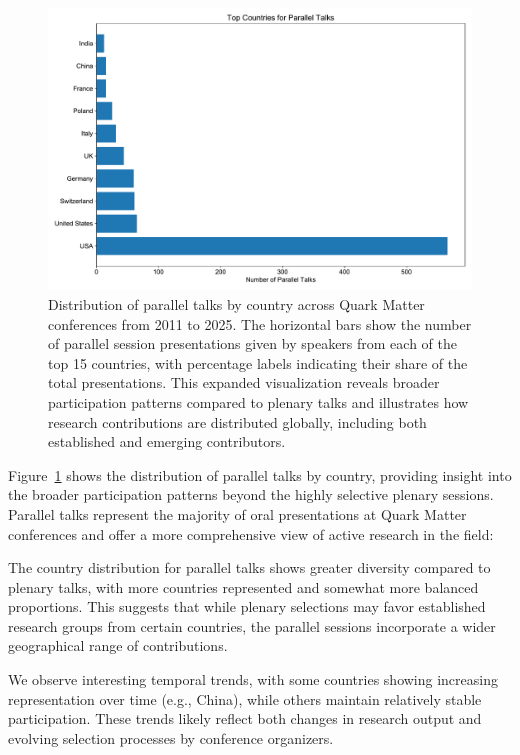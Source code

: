\documentclass[a4paper,11pt]{article}
\begin{document}
\begin{figure}[H]
\centering
\includegraphics[width=\textwidth]{figures/parallel_talks_by_country.pdf}
\caption{Distribution of parallel talks by country across Quark Matter conferences from 2011 to 2025. The horizontal bars show the number of parallel session presentations given by speakers from each of the top 15 countries, with percentage labels indicating their share of the total presentations. This expanded visualization reveals broader participation patterns compared to plenary talks and illustrates how research contributions are distributed globally, including both established and emerging contributors.}
\label{fig:country_parallel}
\end{figure}

Figure~\ref{fig:country_parallel} shows the distribution of parallel talks by country, providing insight into the broader participation patterns beyond the highly selective plenary sessions. Parallel talks represent the majority of oral presentations at Quark Matter conferences and offer a more comprehensive view of active research in the field:

The country distribution for parallel talks shows greater diversity compared to plenary talks, with more countries represented and somewhat more balanced proportions. This suggests that while plenary selections may favor established research groups from certain countries, the parallel sessions incorporate a wider geographical range of contributions.

We observe interesting temporal trends, with some countries showing increasing representation over time (e.g., China), while others maintain relatively stable participation. These trends likely reflect both changes in research output and evolving selection processes by conference organizers.
\end{document}
